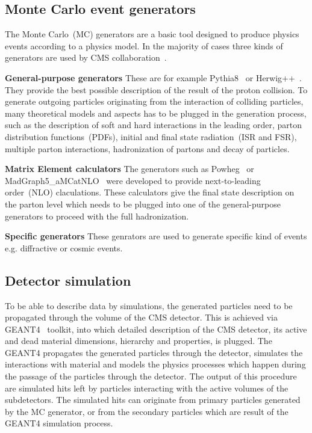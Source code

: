 \subsection{Monte Carlo event generators}

The Monte Carlo~(MC) generators are a basic tool designed to produce physics events according to a physics model. In the majority of cases three kinds of generators are used by CMS collaboration~\cite{website:generation, website:generationIntro}. 

\textbf{General-purpose generators}
These are for example Pythia8~\cite{Sjostrand:2014zea} or Herwig++~\cite{Bahr:2008pv}. They provide the best possible description of the result of the proton collision. To generate outgoing particles originating from the interaction of colliding particles, many theoretical models and aspects has to be plugged in the generation process, such as the description of soft and hard interactions in the leading order, parton distribution functions~(PDFs), initial and final state radiation~(ISR and FSR), multiple parton interactions, hadronization of partons and decay of particles.

\textbf{Matrix Element calculators}
The generators such as Powheg~\cite{Oleari:2010nx} or MadGraph5\_aMCatNLO~\cite{Alwall:2014hca} were developed to provide next-to-leading order~(NLO) claculations. These calculators give the final state description on the parton level which needs to be plugged into one of the general-purpose generators to proceed with the full hadronization.

\textbf{Specific generators}
These genrators are used to generate specific kind of events e.g. diffractive or cosmic events.

\subsection{Detector simulation}

To be able to describe data by simulations, the generated particles need to be propagated through the volume of the CMS detector. This is achieved via GEANT4~\cite{Agostinelli:2002hh ,Lefebure:1999wja} toolkit, into which detailed description of the CMS detector, its active and dead material dimensions, hierarchy and properties, is plugged. The GEANT4 propagates the generated particles through the detector, simulates the interactions with material and models the physics processes which happen during the passage of the particles through the detector. The output of this procedure are simulated hits left by particles interacting with the active volumes of the subdetectors. The simulated hits can originate from primary particles generated by the MC generator, or from the secondary particles which are result of the GEANT4 simulation process.

